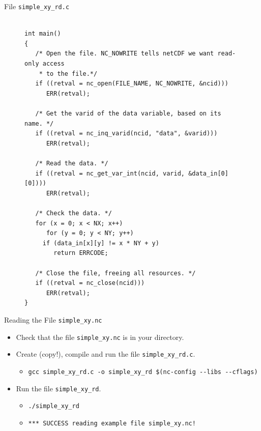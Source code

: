 \documentclass[compress,11pt,xcolor=svgnames,aspectratio=169]{beamer}
\begin{document}
\begin{frame}[fragile]{File \texttt{simple\_xy\_rd.c}}

\begin{figure}
\centering
\begin{varwidth}{\linewidth}
{\tiny

\begin{verbatim}

int main()
{
   /* Open the file. NC_NOWRITE tells netCDF we want read-only access
    * to the file.*/
   if ((retval = nc_open(FILE_NAME, NC_NOWRITE, &ncid)))
      ERR(retval);

   /* Get the varid of the data variable, based on its name. */
   if ((retval = nc_inq_varid(ncid, "data", &varid)))
      ERR(retval);

   /* Read the data. */
   if ((retval = nc_get_var_int(ncid, varid, &data_in[0][0])))
      ERR(retval);

   /* Check the data. */
   for (x = 0; x < NX; x++)
      for (y = 0; y < NY; y++)
	 if (data_in[x][y] != x * NY + y)
	    return ERRCODE;

   /* Close the file, freeing all resources. */
   if ((retval = nc_close(ncid)))
      ERR(retval);
}

\end{verbatim}

}
\end{varwidth}
\end{figure}

\end{frame}

\begin{frame}[fragile]{Reading the File \texttt{simple\_xy.nc}}

\begin{itemize}
\setlength\itemsep{0.6cm}

  \item Check that the file \verb|simple_xy.nc| is in your directory.

  \item Create (copy!), compile and run the file \verb|simple_xy_rd.c|.

        \begin{itemize}
          \item {\footnotesize  \verb|gcc simple_xy_rd.c -o simple_xy_rd $(nc-config --libs --cflags)| }
        \end{itemize}

  \item Run the file \verb|simple_xy_rd|.

        \begin{itemize}
        \setlength\itemsep{0.2cm}
          \item {\footnotesize  \verb|./simple_xy_rd|}
          \item {\footnotesize  \verb|*** SUCCESS reading example file simple_xy.nc!|}
        \end{itemize}

\end{itemize}

\end{frame}
\end{document}

